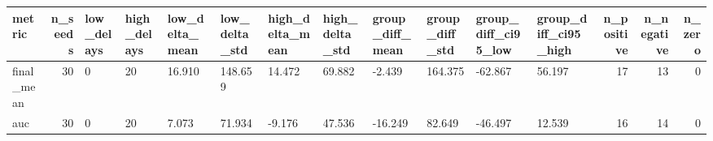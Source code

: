 \begin{tabular}{lrllllllllllrrr}
\toprule
metric & n_seeds & low_delays & high_delays & low_delta_mean & low_delta_std & high_delta_mean & high_delta_std & group_diff_mean & group_diff_std & group_diff_ci95_low & group_diff_ci95_high & n_positive & n_negative & n_zero \\
\midrule
final_mean & 30 & 0 & 20 & 16.910 & 148.659 & 14.472 & 69.882 & -2.439 & 164.375 & -62.867 & 56.197 & 17 & 13 & 0 \\
auc & 30 & 0 & 20 & 7.073 & 71.934 & -9.176 & 47.536 & -16.249 & 82.649 & -46.497 & 12.539 & 16 & 14 & 0 \\
\bottomrule
\end{tabular}
